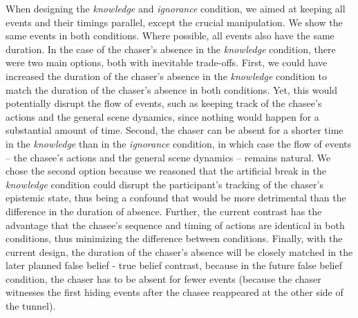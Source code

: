\documentclass[
  english,
  man,floatsintext]{apa6}
\begin{document}
When designing the \emph{knowledge} and \emph{ignorance} condition, we aimed at keeping all events and their timings parallel, except the crucial manipulation. We show the same events in both conditions. Where possible, all events also have the same duration. In the case of the chaser's absence in the \emph{knowledge} condition, there were two main options, both with inevitable trade-offs. First, we could have increased the duration of the chaser's absence in the \emph{knowledge} condition to match the duration of the chaser's absence in both conditions. Yet, this would potentially disrupt the flow of events, such as keeping track of the chasee's actions and the general scene dynamics, since nothing would happen for a substantial amount of time. Second, the chaser can be absent for a shorter time in the \emph{knowledge} than in the \emph{ignorance} condition, in which case the flow of events -- the chasee's actions and the general scene dynamics -- remains natural. We chose the second option because we reasoned that the artificial break in the \emph{knowledge} condition could disrupt the participant's tracking of the chaser's epistemic state, thus being a confound that would be more detrimental than the difference in the duration of absence. Further, the current contrast has the advantage that the chasee's sequence and timing of actions are identical in both conditions, thus minimizing the difference between conditions. Finally, with the current design, the duration of the chaser's absence will be closely matched in the later planned false belief - true belief contrast, because in the future false belief condition, the chaser has to be absent for fewer events (because the chaser witnesses the first hiding events after the chasee reappeared at the other side of the tunnel).
\end{document}
